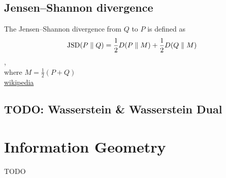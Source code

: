 \subsection{Jensen–Shannon divergence}
The Jensen–Shannon divergence from $Q$ to $P$ is defined as
\begin{align*}
	{{\rm {JSD}}}(P\parallel Q)={\frac  {1}{2}}D(P\parallel M)+{\frac  {1}{2}}D(Q\parallel M)
\end{align*},\\
 where $M={\frac  {1}{2}}(P+Q)$\\
\href{https://en.wikipedia.org/wiki/Jensen–Shannon_divergence}{wikipedia}

\subsection{TODO: Wasserstein \& Wasserstein Dual}

\section{Information Geometry}
TODO